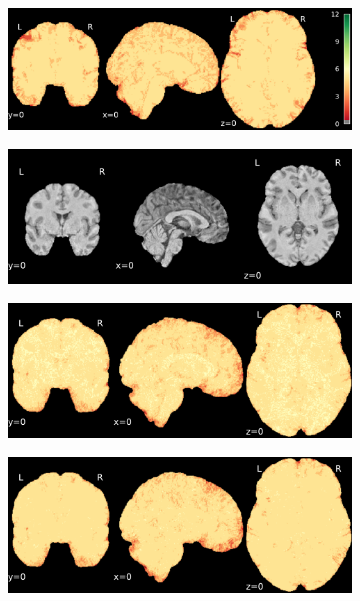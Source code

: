 \documentclass{article}
\begin{document}
\begin{landscape}
\begin{figure}
\begin{subfigure}[t]{0.2\paperheight}
            \centering
            \includegraphics[width=\textwidth]{figures/sig/ds001600_sub-1_rr.rs_sig.pdf}
        \end{subfigure}
        \begin{subfigure}[t]{0.2\paperheight}
            \centering
            \includegraphics[width=\textwidth]{figures/ieee_T1/ds001771_sub-36_ieee_mean.pdf}
        \end{subfigure}
        \begin{subfigure}[t]{0.2\paperheight}
            \centering
            \includegraphics[width=\textwidth]{figures/sig/ds001771_sub-36_rr_sig.pdf}
        \end{subfigure}
        \begin{subfigure}[t]{0.2\paperheight}
            \centering
            \includegraphics[width=\textwidth]{figures/sig/ds001771_sub-36_rs_sig.pdf}

\end{subfigure}
\end{figure}
\end{landscape}
\end{document}
